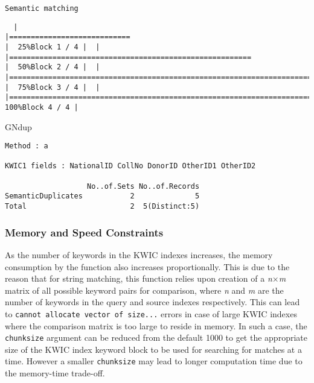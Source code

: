 \documentclass[
]{article}
\newenvironment{Shaded}{\begin{snugshade}}{\end{snugshade}}
\newcommand{\NormalTok}[1]{#1}
\begin{document}
\begin{verbatim}
Semantic matching
\end{verbatim}

\begin{verbatim}
  |                                                                                                                       |============================                                                                                   |  25%Block 1 / 4 |  |                                                                                                                       |========================================================                                                       |  50%Block 2 / 4 |  |                                                                                                                       |===================================================================================                            |  75%Block 3 / 4 |  |                                                                                                                       |===============================================================================================================| 100%Block 4 / 4 |
\end{verbatim}

\begin{Shaded}
\begin{Highlighting}[]
\NormalTok{GNdup}
\end{Highlighting}
\end{Shaded}

\begin{verbatim}
Method : a

KWIC1 fields : NationalID CollNo DonorID OtherID1 OtherID2
 
                   No..of.Sets No..of.Records
SemanticDuplicates           2              5
Total                        2  5(Distinct:5)
\end{verbatim}

\hypertarget{memory-and-speed-constraints}{%
\subsubsection{Memory and Speed
Constraints}\label{memory-and-speed-constraints}}

As the number of keywords in the KWIC indexes increases, the memory
consumption by the function also increases proportionally. This is due
to the reason that for string matching, this function relies upon
creation of a \emph{n}\(\times\)\emph{m} matrix of all possible keyword
pairs for comparison, where \emph{n} and \emph{m} are the number of
keywords in the query and source indexes respectively. This can lead to
\texttt{cannot\ allocate\ vector\ of\ size...} errors in case of large
KWIC indexes where the comparison matrix is too large to reside in
memory. In such a case, the \texttt{chunksize} argument can be reduced
from the default 1000 to get the appropriate size of the KWIC index
keyword block to be used for searching for matches at a time. However a
smaller \texttt{chunksize} may lead to longer computation time due to
the memory-time trade-off.
\end{document}
